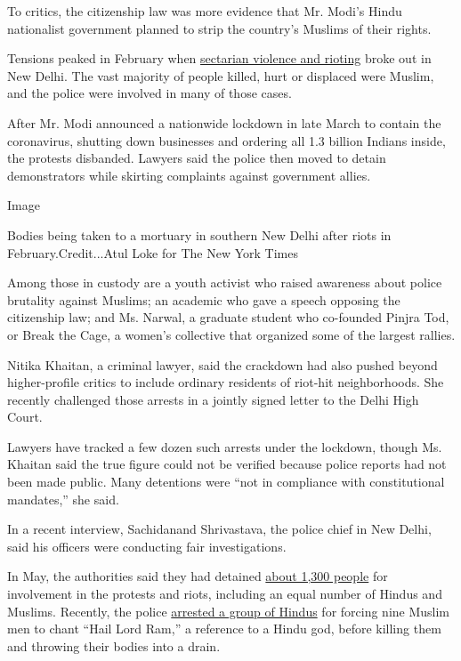 To critics, the citizenship law was more evidence that Mr. Modi's Hindu
nationalist government planned to strip the country's Muslims of their
rights.

Tensions peaked in February when
\href{https://www.nytimes.com/2020/02/25/world/asia/new-delhi-hindu-muslim-violence.html}{sectarian
violence and rioting} broke out in New Delhi. The vast majority of
people killed, hurt or displaced were Muslim, and the police were
involved in many of those cases.

After Mr. Modi announced a nationwide lockdown in late March to contain
the coronavirus, shutting down businesses and ordering all 1.3 billion
Indians inside, the protests disbanded. Lawyers said the police then
moved to detain demonstrators while skirting complaints against
government allies.

Image

Bodies being taken to a mortuary in southern New Delhi after riots in
February.Credit...Atul Loke for The New York Times

Among those in custody are a youth activist who raised awareness about
police brutality against Muslims; an academic who gave a speech opposing
the citizenship law; and Ms. Narwal, a graduate student who co-founded
Pinjra Tod, or Break the Cage, a women's collective that organized some
of the largest rallies.

Nitika Khaitan, a criminal lawyer, said the crackdown had also pushed
beyond higher-profile critics to include ordinary residents of riot-hit
neighborhoods. She recently challenged those arrests in a jointly signed
letter to the Delhi High Court.

Lawyers have tracked a few dozen such arrests under the lockdown, though
Ms. Khaitan said the true figure could not be verified because police
reports had not been made public. Many detentions were ``not in
compliance with constitutional mandates,'' she said.

In a recent interview, Sachidanand Shrivastava, the police chief in New
Delhi, said his officers were conducting fair investigations.

In May, the authorities said they had detained
\href{https://www.thehindu.com/news/cities/Delhi/1300-persons-arrested-for-north-east-delhi-riots-police/article31604364.ece}{about
1,300 people} for involvement in the protests and riots, including an
equal number of Hindus and Muslims. Recently, the police
\href{https://www.thehindu.com/news/cities/Delhi/nine-of-those-killed-in-northeast-delhi-riots-were-forced-to-shout-jai-shri-ram/article31973715.ece}{arrested
a group of Hindus} for forcing nine Muslim men to chant ``Hail Lord
Ram,'' a reference to a Hindu god, before killing them and throwing
their bodies into a drain.

